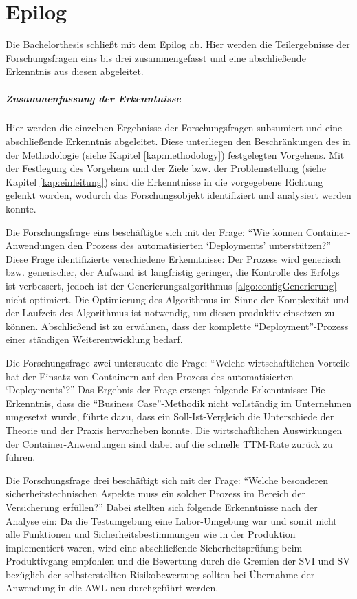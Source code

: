 \chapter{Epilog} \label{kritischeBetrachtung}
Die Bachelorthesis schließt mit dem Epilog ab. Hier werden die Teilergebnisse der Forschungsfragen eins bis drei zusammengefasst und eine abschließende Erkenntnis aus diesen abgeleitet. 
\paragraph{Zusammenfassung der Erkenntnisse}
Hier werden die einzelnen Ergebnisse der Forschungsfragen subsumiert und eine abschließende Erkenntnis abgeleitet. Diese unterliegen den Beschränkungen des in der Methodologie (siehe Kapitel \vref{kap:methodology}) festgelegten Vorgehens. Mit der Festlegung des Vorgehens und der Ziele bzw. der Problemstellung (siehe Kapitel \vref{kap:einleitung}) sind die Erkenntnisse in die vorgegebene Richtung gelenkt worden, wodurch das Forschungsobjekt identifiziert und analysiert werden konnte.
\par
Die Forschungsfrage eins beschäftigte sich mit der Frage: \enquote{Wie können Container-Anwendungen den Prozess des automatisierten \enquote{Deployments} unterstützen?} Diese Frage identifizierte verschiedene Erkenntnisse: Der Prozess wird generisch bzw. generischer, der Aufwand ist langfristig geringer, die Kontrolle des Erfolgs ist verbessert, jedoch ist der Generierungsalgorithmus \vref{algo:configGenerierung} nicht optimiert. Die Optimierung des Algorithmus im Sinne der Komplexität und der Laufzeit des Algorithmus ist notwendig, um diesen produktiv einsetzen zu können. Abschließend ist zu erwähnen, dass der komplette \enquote{Deployment}-Prozess einer ständigen Weiterentwicklung bedarf.
\par
Die Forschungsfrage zwei untersuchte die Frage: \enquote{Welche wirtschaftlichen Vorteile hat der Einsatz von Containern auf den Prozess des automatisierten \enquote{Deployments}?} Das Ergebnis der Frage erzeugt folgende Erkenntnisse: Die Erkenntnis, dass die \enquote{Business Case}-Methodik nicht vollständig im Unternehmen umgesetzt wurde, führte dazu, dass ein Soll-Ist-Vergleich die Unterschiede der Theorie und der Praxis hervorheben konnte. Die wirtschaftlichen Auswirkungen der Container-Anwendungen sind dabei auf die schnelle \ac{TTM}-Rate zurück zu führen.
\par
Die Forschungsfrage drei beschäftigt sich mit der Frage: \enquote{Welche besonderen sicherheitstechnischen Aspekte muss ein solcher Prozess im Bereich der Versicherung erfüllen?} Dabei stellten sich folgende Erkenntnisse nach der Analyse ein: Da die Testumgebung eine Labor-Umgebung war und somit nicht alle Funktionen und Sicherheitsbestimmungen wie in der Produktion implementiert waren, wird eine abschließende Sicherheitsprüfung beim Produktivgang empfohlen und die Bewertung durch die Gremien der \ac{SVI} und \ac{SV} bezüglich der selbsterstellten Risikobewertung sollten bei Übernahme der Anwendung in die \ac{AWL} neu durchgeführt werden.

